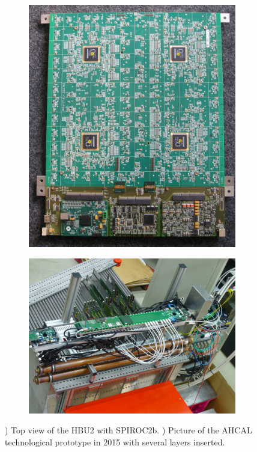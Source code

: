 \begin{figure}[htbp!]
  \centering
  \begin{subfigure}[t]{0.37\textwidth}
    \includegraphics[width=1.\linewidth]{chap3/fig/CALICE_AHCAL_20120323.jpg}
    \caption{} \label{fig:AHCALHBU}
  \end{subfigure}
  \hfill
  \begin{subfigure}[t]{0.58\textwidth}
    \includegraphics[width=1.\linewidth]{chap3/fig/P1030531_small.jpg}
    \caption{} \label{fig:AHCALStack2015}
  \end{subfigure}
  \caption{) Top view of the HBU2 with SPIROC2b. ) Picture of the AHCAL technological prototype in 2015 with several layers inserted.}
\end{figure}

